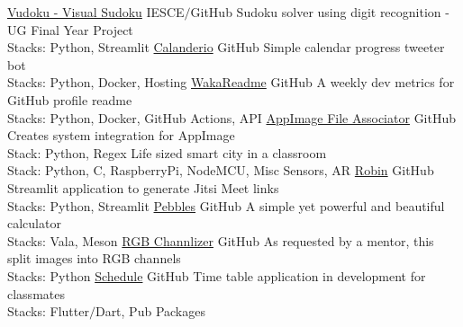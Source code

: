 \documentclass[
	a4paper,
]{fortysecondscv}
\begin{document}
\begin{cvtable}[1.5]
\end{cvtable}


\newpage
\makebacksidebar

\begin{cvtable}[2]
    {\href{https://github.com/joe733/vudoku}{Vudoku - Visual Sudoku}}
    {IESCE$/$GitHub}
    {Sudoku solver using digit recognition - UG Final Year Project\\
    Stacks: Python, Streamlit}
    {\href{https://github.com/joe733/Calendario/}{Calanderio}}
    {GitHub}
	{Simple calendar progress tweeter bot\\
	Stacks: Python, Docker, Hosting}
	{\href{https://github.com/athul/waka-readme}{WakaReadme}}
	{GitHub}
	{A weekly dev metrics for GitHub profile readme\\
	Stacks: Python, Docker, GitHub Actions, API}
	{\href{https://github.com/joe733/appimage_file_associator}{AppImage File Associator}}
	{GitHub}
	{Creates system integration for AppImage\\
	Stack: Python, Regex}
	{Life sized smart city in a classroom\\
	Stack: Python, C, RaspberryPi, NodeMCU, Misc Sensors, AR}
	{\href{https://github.com/joe733/robin}{Robin}}
	{GitHub}
	{Streamlit application to generate Jitsi Meet links\\
	Stacks: Python, Streamlit}
	{\href{https://github.com/joe733/pebbles}{Pebbles}}
	{GitHub}
	{A simple yet powerful and beautiful calculator\\
	Stacks: Vala, Meson}
	{\href{https://github.com/joe733/eye-defect/}{RGB Channlizer}}
	{GitHub}
	{As requested by a mentor, this split images into RGB channels\\
	Stacks: Python}
	{\href{https://github.com/joe733/schedule}{Schedule}}
	{GitHub}
	{Time table application in development for classmates\\
	Stacks: Flutter$/$Dart, Pub Packages}
\end{cvtable}
\end{document}
